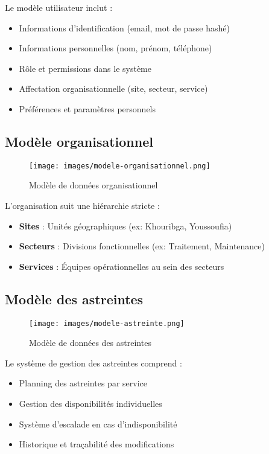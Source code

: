Le modèle utilisateur inclut :
\begin{itemize}
    \item Informations d'identification (email, mot de passe hashé)
    \item Informations personnelles (nom, prénom, téléphone)
    \item Rôle et permissions dans le système
    \item Affectation organisationnelle (site, secteur, service)
    \item Préférences et paramètres personnels
\end{itemize}

\subsection{Modèle organisationnel}
\begin{figure}[h]
\centering
\texttt{[image: images/modele-organisationnel.png]}
\caption{Modèle de données organisationnel}
\label{fig:modele-organisationnel}
\end{figure}

L'organisation suit une hiérarchie stricte :
\begin{itemize}
    \item \textbf{Sites} : Unités géographiques (ex: Khouribga, Youssoufia)
    \item \textbf{Secteurs} : Divisions fonctionnelles (ex: Traitement, Maintenance)
    \item \textbf{Services} : Équipes opérationnelles au sein des secteurs
\end{itemize}

\subsection{Modèle des astreintes}
\begin{figure}[h]
\centering
\texttt{[image: images/modele-astreinte.png]}
\caption{Modèle de données des astreintes}
\label{fig:modele-astreinte}
\end{figure}

Le système de gestion des astreintes comprend :
\begin{itemize}
    \item Planning des astreintes par service
    \item Gestion des disponibilités individuelles
    \item Système d'escalade en cas d'indisponibilité
    \item Historique et traçabilité des modifications
\end{itemize}

